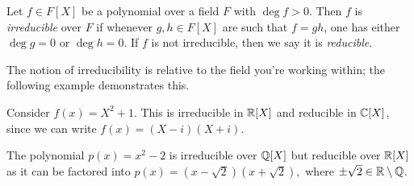 \begin{definition}
  Let $f\in F[X]$ be a polynomial over a field $F$ with $\deg f>0$. Then $f$ is
  \emph{irreducible} over $F$ if whenever $g,h\in F[X]$ are such that $f=gh$, one has either $\deg
  g=0$ or $\deg h=0$. If $f$ is not irreducible, then we say it is \emph{reducible}.
\end{definition}
\begin{remark}
  The notion of irreducibility is relative to the field you're working within; the following example demonstrates this.
\end{remark}
\begin{example}
  Consider $f(x)=X^2+1$. This is irreducible in $\mathbb R[X]$ and reducible in $\mathbb C[X]$, since we can write $f(x)=(X-i)(X+i)$.

  The polynomial $p(x)=x^2-2$ is irreducible over $\mathbb Q[X]$ but reducible over $\mathbb R[X]$ as it can be factored into $p(x)=(x-\sqrt{2})(x+\sqrt{2}),$ where $\pm \sqrt{2}\in \mathbb R \setminus \mathbb Q$.
\end{example}

